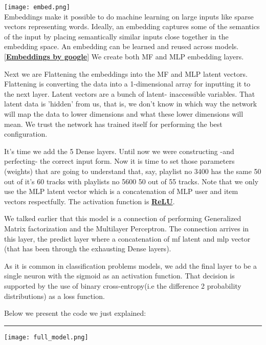 \documentclass[]{article}
\begin{document}
\texttt{[image: embed.png]}
\\
 Embeddings make it possible to do machine learning on large inputs like sparse vectors representing words. Ideally, an embedding captures some of the semantics of the input by placing semantically similar inputs close together in the embedding space. An embedding can be learned and reused across models. [\href{https://developers.google.com/machine-learning/crash-course/embeddings/video-lecture}{\textbf{Embeddings by google}}] We create both MF and MLP embedding layers.

Next we are Flattening the embeddings into the MF and MLP latent vectors. Flattening is converting the data into a 1-dimensional array for inputting it to the next layer. Latent vectors are a bunch of latent- inaccessible variables.
That latent data is 'hidden' from us, that is, we don't know in which way the network will map the data to lower dimensions and what these lower dimensions will mean. We trust the network has trained itself for performing the best configuration.

It's time we add the 5 Dense layers. Until now we were constructing -and perfecting- the correct input form. Now it is time to set those parameters (weights) that are going to understand that, say, playlist no 3400 has the same 50 out of it's 60 tracks with playlists no 5600 50 out of 55 tracks. Note that we only use the MLP latent vector which is a concatenation of MLP user and item vectors respectfully. The activation function is \href{https://towardsdatascience.com/activation-functions-neural-networks-1cbd9f8d91d6#:~:text=ReLU%20(Rectified%20Linear%20Unit)%20Activation%20Function}{\textbf{ReLU}}. 

We talked earlier that this model is a connection of performing Generalized Matrix factorization and the Multilayer Perceptron. The connection arrives in this layer, the predict layer where a concatenation of mf latent and mlp vector (that has been through the exhausting Dense layers). 

As it is common in classification problems models, we add the final layer to be a single neuron with the sigmoid as an activation function. That decision is supported by the use of binary cross-entropy(i.e the difference 2 probability distributions) as a loss function.

Below we present the code we just explained:
\\
\noindent
{\color{Blue} \rule{\linewidth}{0.5mm}}
\texttt{[image: full\_model.png]}
\end{document}
